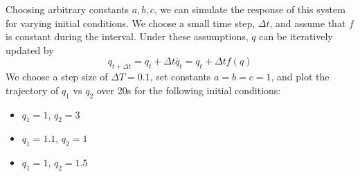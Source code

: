 \documentclass[12pt]{article}
\begin{document}
	Choosing arbitrary constants $a, b, c$, we can simulate the response of this system for varying initial conditions. We choose a small time step, $\Delta t$, and assume that $f$ is constant during the interval. Under these assumptions, $q$ can be iteratively updated by
	$$q_{t + \Delta t} = q_t + \Delta t \dot{q_t} = q_t + \Delta t f(q)$$
	We choose a step size of $\Delta T = 0.1$, set constants $a = b = c = 1$, and plot the trajectory of $q_1$ vs $q_2$ over 20s for the following initial conditions:
	\begin{itemize}
		\item $q_1 = 1$, $q_2 = 3$
		\item $q_1 = 1.1$, $q_2 = 1$
		\item $q_1 = 1$, $q_2 = 1.5$
	\end{itemize}
\end{document}
